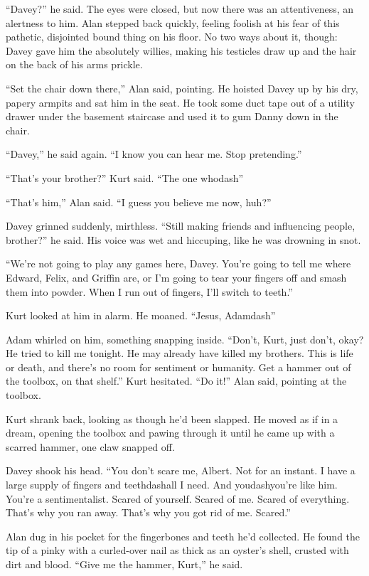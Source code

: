``Davey?'' he said.  The eyes were closed, but now there was an
attentiveness, an alertness to him.  Alan stepped back quickly,
feeling foolish at his fear of this pathetic, disjointed bound thing
on his floor.  No two ways about it, though:  Davey gave him the
absolutely willies, making his testicles draw up and the hair on the
back of his arms prickle.

``Set the chair down there,'' Alan said, pointing.  He hoisted Davey
up by his dry, papery armpits and sat him in the seat.  He took some
duct tape out of a utility drawer under the basement staircase and
used it to gum Danny down in the chair.

``Davey,'' he said again.  ``I know you can hear me.  Stop
pretending.''

``That's your brother?'' Kurt said.  ``The one whodash{}''

``That's him,'' Alan said.  ``I guess you believe me now, huh?''

Davey grinned suddenly, mirthless.  ``Still making friends and
influencing people, brother?'' he said.  His voice was wet and
hiccuping, like he was drowning in snot.

``We're not going to play any games here, Davey.  You're going to tell
me where Edward, Felix, and Griffin are, or I'm going to tear your
fingers off and smash them into powder.  When I run out of fingers,
I'll switch to teeth.''

Kurt looked at him in alarm.  He moaned.  ``Jesus, Adamdash{}''

Adam whirled on him, something snapping inside.  ``Don't, Kurt, just
don't, okay?  He tried to kill me tonight.  He may already have killed
my brothers.  This is life or death, and there's no room for sentiment
or humanity.  Get a hammer out of the toolbox, on that shelf.'' Kurt
hesitated.  ``Do it!'' Alan said, pointing at the toolbox.

Kurt shrank back, looking as though he'd been slapped.  He moved as if
in a dream, opening the toolbox and pawing through it until he came up
with a scarred hammer, one claw snapped off.

Davey shook his head.  ``You don't scare me, Albert.  Not for an
instant.  I have a large supply of fingers and teethdash{}all I need. 
And youdash{}you're like him.  You're a sentimentalist.  Scared of
yourself.  Scared of me.  Scared of everything.  That's why you ran
away.  That's why you got rid of me.  Scared.''

Alan dug in his pocket for the fingerbones and teeth he'd collected. 
He found the tip of a pinky with a curled-over nail as thick as an
oyster's shell, crusted with dirt and blood.  ``Give me the hammer,
Kurt,'' he said.


